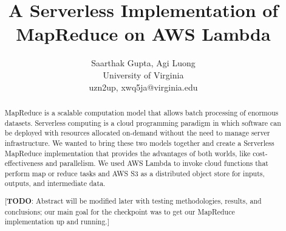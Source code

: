 \documentclass[letterpaper,twocolumn,10pt]{article}
\begin{document}

\date{}

\title{\Large \bf A Serverless Implementation of MapReduce on AWS Lambda}

\author{
	Saarthak Gupta, Agi Luong\\
	{University of Virginia}\\
	{uzn2up, xwq5ja}@virginia.edu
} 

\maketitle

\begin{abstract}
MapReduce is a scalable computation model that allows batch processing of enormous datasets. Serverless computing is a cloud programming paradigm in which software can be deployed with resources allocated on-demand without the need to manage server infrastructure. We wanted to bring these two models together and create a Serverless MapReduce implementation that provides the advantages of both worlds, like cost-effectiveness and parallelism. We used AWS Lambda to invoke cloud functions that perform map or reduce tasks and AWS S3 as a distributed object store for inputs, outputs, and intermediate data.

[\textbf{TODO}: Abstract will be modified later with testing methodologies, results, and conclusions; our main goal for the checkpoint was to get our MapReduce implementation up and running.]
\end{abstract}














\end{document}
